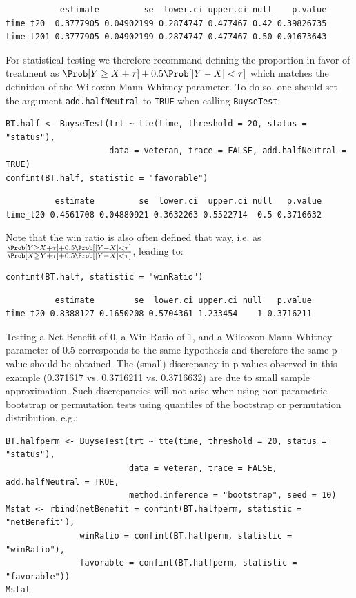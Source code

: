 \documentclass[12pt]{article}
\begin{document}
\begin{verbatim}
           estimate         se  lower.ci upper.ci null    p.value
time_t20  0.3777905 0.04902199 0.2874747 0.477467 0.42 0.39826735
time_t201 0.3777905 0.04902199 0.2874747 0.477467 0.50 0.01673643
\end{verbatim}


For statistical testing we therefore recommand defining the proportion
in favor of treatment as \(\Prob[Y\geq X + \tau] + 0.5\Prob[|Y- X| <
\tau]\) which matches the definition of the Wilcoxon-Mann-Whitney
parameter. To do so, one should set the argument \texttt{add.halfNeutral} to
\texttt{TRUE} when calling \texttt{BuyseTest}:
\lstset{language=r,label= ,caption= ,captionpos=b,numbers=none}
\begin{lstlisting}
BT.half <- BuyseTest(trt ~ tte(time, threshold = 20, status = "status"),
                     data = veteran, trace = FALSE, add.halfNeutral = TRUE)
confint(BT.half, statistic = "favorable")
\end{lstlisting}

\begin{verbatim}
          estimate         se  lower.ci  upper.ci null   p.value
time_t20 0.4561708 0.04880921 0.3632263 0.5522714  0.5 0.3716632
\end{verbatim}


Note that the win ratio is also often defined that way, i.e. as
\(\frac{\Prob[Y\geq X + \tau] + 0.5\Prob[|Y- X| < \tau]}{\Prob[X\geq Y +
\tau] + 0.5\Prob[|Y- X| < \tau]}\), leading to:
\lstset{language=r,label= ,caption= ,captionpos=b,numbers=none}
\begin{lstlisting}
confint(BT.half, statistic = "winRatio")
\end{lstlisting}

\begin{verbatim}
          estimate        se  lower.ci upper.ci null   p.value
time_t20 0.8388127 0.1650208 0.5704361 1.233454    1 0.3716211
\end{verbatim}


Testing a Net Benefit of 0, a Win Ratio of 1, and a
Wilcoxon-Mann-Whitney parameter of 0.5 corresponds to the same
hypothesis and therefore the same p-value should be obtained. The
(small) discrepancy in p-values observed in this example (0.371617
vs. 0.3716211 vs. 0.3716632) are due to small sample
approximation. Such discrepancies will not arise when using
non-parametric bootstrap or permutation tests using quantiles of the
bootstrap or permutation distribution, e.g.:
\lstset{language=r,label= ,caption= ,captionpos=b,numbers=none}
\begin{lstlisting}
BT.halfperm <- BuyseTest(trt ~ tte(time, threshold = 20, status = "status"),
                         data = veteran, trace = FALSE, add.halfNeutral = TRUE,
                         method.inference = "bootstrap", seed = 10)
Mstat <- rbind(netBenefit = confint(BT.halfperm, statistic = "netBenefit"),
               winRatio = confint(BT.halfperm, statistic = "winRatio"),
               favorable = confint(BT.halfperm, statistic = "favorable"))
Mstat
\end{lstlisting}
\end{document}

